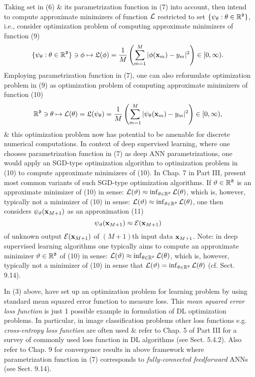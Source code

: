 \documentclass{article}
\begin{document}
Taking set in (6) \& its parametrization function in (7) into account, then intend to compute approximate minimizers of function ${\cal L}$ restricted to set $\{\psi_\theta:\theta\in\mathbb{R}^{\frak d}\}$, i.e., consider optimization problem of computing approximate minimizers of function (9)
\begin{equation}
	\{\psi_\theta:\theta\in\mathbb{R}^{\frak d}\}\ni\phi\mapsto{\frak L}(\phi) = \frac{1}{M}\left(\sum_{m=1}^M |\phi({\bf x}_m) - y_m|^2\right)\in[0,\infty).
\end{equation}
Employing parametrization function in (7), one can also reformulate optimization problem in (9) as optimization problem of computing approximate minimizers of function (10)
\begin{equation}
	\mathbb{R}^{\frak d}\ni\theta\mapsto{\cal L}(\theta) = {\frak L}(\psi_\theta) = \frac{1}{M}\left(\sum_{m=1}^M |\psi_\theta({\bf x}_m) - y_m|^2\right)\in[0,\infty),
\end{equation}
\& this optimization problem now has potential to be amenable for discrete numerical computations. In context of deep supervised learning, where one chooses parametrization function in (7) as deep ANN parametrizations, one would apply an SGD-type optimization algorithm to optimization problem in (10) to compute approximate minimizers of (10). In Chap. 7 in Part III, present most common variants of such SGD-type optimization algorithms. If $\vartheta\in\mathbb{R}^{\frak d}$ is an approximate minimizer of (10) in sense: ${\cal L}(\vartheta)\approx\inf_{\theta\in\mathbb{R}^{\frak d}} {\cal L}(\theta)$, which is, however, typically not a minimizer of (10) in sense: ${\cal L}(\vartheta)\approx\inf_{\theta\in\mathbb{R}^{\frak d}} {\cal L}(\theta)$, one then considers $\psi_\vartheta({\bf x}_{M+1})$ as an approximation (11)
\begin{equation}
	\psi_\vartheta({\bf x}_{M+1})\approx{\cal E}({\bf x}_{M+1})
\end{equation}
of unknown output ${\cal E}({\bf x}_{M+1})$ of $(M + 1)$th input data ${\bf x}_{M+1}$. Note: in deep supervised learning algorithms one typically aims to compute an approximate minimizer $\vartheta\in\mathbb{R}^{\frak d}$ of (10) in sense: ${\cal L}(\vartheta)\approx\inf_{\theta\in\mathbb{R}^{\frak d}} {\cal L}(\theta)$, which is, however, typically not a minimizer of (10) in sense that ${\cal L}(\vartheta) = \inf_{\theta\in\mathbb{R}^{\frak d}} {\cal L}(\theta)$ (cf. Sect. 9.14).

In (3) above, have set up an optimization problem for learning problem by using standard mean squared error function to measure loss. This {\it mean squared error loss function} is just 1 possible example in formulation of DL optimization problems. In particular, in image classification problems other loss functions e.g. {\it cross-entropy loss function} are often used \& refer to Chap. 5 of Part III for a survey of commonly used loss function in DL algorithms (see Sect. 5.4.2). Also refer to Chap. 9 for convergence results in above framework where parametrization function in (7) corresponds to {\it fully-connected feedforward} ANNs (see Sect. 9.14).
\end{document}
